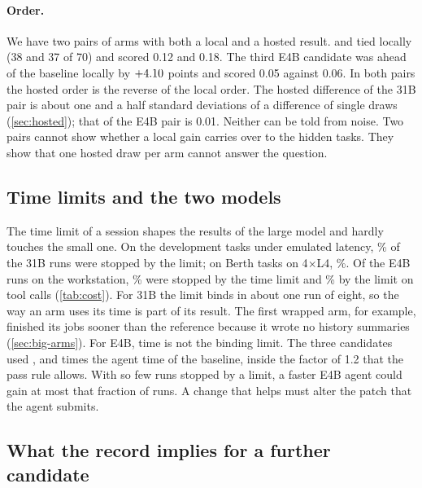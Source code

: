 \paragraph{Order.}
We have two pairs of arms with both a local and a hosted result.  and  tied locally (38 and 37 of
70) and scored 0.12 and 0.18. The third E4B candidate was ahead of the baseline locally by $+4.10$ points and
scored 0.05 against 0.06. In both pairs the hosted order is the reverse of the local order. The hosted difference of
the 31B pair is about one and a half standard deviations of a difference of single draws (\cref{sec:hosted}); that
of the E4B pair is 0.01. Neither can be told from noise. Two pairs cannot show whether a local gain carries over to
the hidden tasks. They show that one hosted draw per arm cannot answer the question.

\subsection{Time limits and the two models}\label{sec:limits-models}

The time limit of a session shapes the results of the large model and hardly touches the small one. On the development
tasks under emulated latency, \TimeoutBigDevPct\% of the 31B runs were stopped by the limit; on Berth tasks on
4$\times$L4, \TimeoutBigBerthPct\%. Of the E4B runs on the workstation, \TimeoutSmallWsPct\% were stopped by the time
limit and \BudgetSmallWsPct\% by the limit on tool calls (\cref{tab:cost}). For 31B the limit binds in about one
run of eight, so the way an arm uses its time is part of its result. The first wrapped arm, for example, finished its
jobs sooner than the reference because it wrote no history summaries (\cref{sec:big-arms}). For E4B, time is not the
binding limit. The three candidates used \RecheckTimeOne{}, \RecheckTimeTwo{} and \RecheckTimeThree{} times the
agent time of the baseline, inside the factor of 1.2 that the pass rule allows. With so few runs stopped by a limit,
a faster E4B agent could gain at most that fraction of runs. A change that helps must alter the patch that the agent
submits.

\subsection{What the record implies for a further candidate}\label{sec:next}

